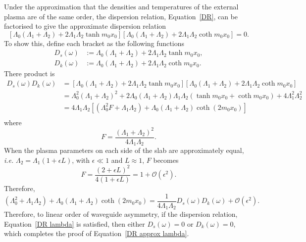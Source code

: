\documentclass[12pt]{../style-files/ociamthesis}
\begin{document}
Under the approximation that the densities and temperatures of the external plasma are of the same order, the dispersion relation, Equation~\eqref{DR}, can be factorised to give the approximate dispersion relation
\begin{equation}
\left[\Lambda_0(\Lambda_1+\Lambda_2)+2\Lambda_1\Lambda_2\tanh{m_0x_0}\right]\left[\Lambda_0(\Lambda_1+\Lambda_2)+2\Lambda_1\Lambda_2\coth{m_0x_0}\right]=0. \label{DR approx lambda}
\end{equation}
To show this, define each bracket as the following functions
\begin{align}
D_s(\omega) &:= \Lambda_0(\Lambda_1 + \Lambda_2) + 2\Lambda_1\Lambda_2\tanh{m_0x_0}, \\
D_k(\omega) &:= \Lambda_0 (\Lambda_1 + \Lambda_2) + 2\Lambda_1\Lambda_2\coth{m_0x_0}.
\end{align}
There product is
\begin{align}
D_s(\omega)D_k(\omega) &= \left[ \Lambda_0(\Lambda_1 + \Lambda_2) + 2\Lambda_1\Lambda_2\tanh{m_0x_0} \right] \left[ \Lambda_0 (\Lambda_1 + \Lambda_2) + 2\Lambda_1\Lambda_2\coth{m_0x_0} \right] \\
&= \Lambda_0^2 (\Lambda_1 + \Lambda_2)^2 + 2\Lambda_0(\Lambda_1 + \Lambda_2)\Lambda_1\Lambda_2(\tanh{m_0x_0} + \coth{m_0x_0}) + 4\Lambda_1^2\Lambda_2^2 \\
&= 4\Lambda_1\Lambda_2 \left[ (\Lambda_0^2F + \Lambda_1\Lambda_2) + \Lambda_0(\Lambda_1 + \Lambda_2)\coth(2m_0x_0) \right] \\
\end{align}
where
\begin{equation}
F = \frac{(\Lambda_1 + \Lambda_2)^2}{4\Lambda_1\Lambda_2}.
\end{equation}
When the plasma parameters on each side of the slab are approximately equal, \textit{i.e.} $\Lambda_2 = \Lambda_1 (1 + \epsilon L)$, with $\epsilon \ll 1$ and $L \approx 1$, $F$ becomes
\begin{equation}
F = \frac{(2 + \epsilon L)^2}{4(1 + \epsilon L)} = 1 + \mathcal{O}(\epsilon^2).
\end{equation}
Therefore, 
\begin{equation}
(\Lambda_0^2 + \Lambda_1\Lambda_2) + \Lambda_0(\Lambda_1 + \Lambda_2)\coth(2m_0x_0) = \frac{1}{4\Lambda_1\Lambda_2} D_s(\omega) D_k(\omega) + \mathcal{O}(\epsilon^2).
\end{equation}
Therefore, to linear order of waveguide asymmetry, if the dispersion relation, Equation~\eqref{DR lambda} is satisfied, then either $D_s(\omega) = 0$ or $D_k(\omega) = 0$, which completes the proof of Equation~\eqref{DR approx lambda}.
\end{document}
